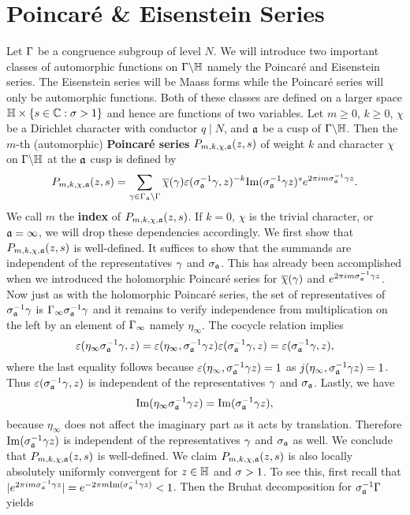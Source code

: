   \section{Poincar\'e \& Eisenstein Series}
    Let $\Gamma$ be a congruence subgroup of level $N$. We will introduce two important classes of automorphic functions on $\Gamma\backslash\mathbb{H}$ namely the Poincar\'e and Eisenstein series. The Eisenstein series will be Maass forms while the Poincar\'e series will only be automorphic functions. Both of these classes are defined on a larger space $\mathbb{H} \times \{s \in \mathbb{C}:\sigma > 1\}$ and hence are functions of two variables. Let $m \ge 0$, $k \ge 0$, $\chi$ be a Dirichlet character with conductor $q \mid N$, and $\mathfrak{a}$ be a cusp of $\Gamma\backslash\mathbb{H}$. Then the $m$-th (automorphic) \textbf{Poincar\'e series} $P_{m,k,\chi,\mathfrak{a}}(z,s)$ of weight $k$ and character $\chi$ on $\Gamma\backslash\mathbb{H}$ at the $\mathfrak{a}$ cusp is defined by
    \[
      P_{m,k,\chi,\mathfrak{a}}(z,s) = \sum_{\gamma \in \Gamma_{\mathfrak{a}}\backslash\Gamma}\overline{\chi}(\gamma)\varepsilon(\sigma_{\mathfrak{a}}^{-1}\gamma,z)^{-k}\mathrm{Im}(\sigma_{\mathfrak{a}}^{-1}\gamma z)^{s}e^{2\pi im\sigma_{\mathfrak{a}}^{-1}\gamma z}.
    \]
    We call $m$ the \textbf{index} of $P_{m,k,\chi,\mathfrak{a}}(z,s)$. If $k = 0$, $\chi$ is the trivial character, or $\mathfrak{a} = \infty$, we will drop these dependencies accordingly. We first show that $P_{m,k,\chi,\mathfrak{a}}(z,s)$ is well-defined. It suffices to show that the summands are independent of the representatives $\gamma$ and $\sigma_{\mathfrak{a}}$. This has already been accomplished when we introduced the holomorphic Poincar\'e series for $\overline{\chi}(\gamma)$ and $e^{2\pi im\sigma_{\mathfrak{a}}^{-1}\gamma z}$. Now just as with the holomorphic Poincar\'e series, the set of representatives of $\sigma_{\mathfrak{a}}^{-1}\gamma$ is $\Gamma_{\infty}\sigma_{\mathfrak{a}}^{-1}\gamma$ and it remains to verify independence from multiplication on the left by an element of $\Gamma_{\infty}$ namely $\eta_{\infty}$. The cocycle relation implies
    \[
      \varepsilon(\eta_{\infty}\sigma_{\mathfrak{a}}^{-1}\gamma,z) = \varepsilon(\eta_{\infty},\sigma_{\mathfrak{a}}^{-1}\gamma z)\varepsilon(\sigma_{\mathfrak{a}}^{-1}\gamma,z) = \varepsilon(\sigma_{\mathfrak{a}}^{-1}\gamma,z),
    \]
    where the last equality follows because $\varepsilon(\eta_{\infty},\sigma_{\mathfrak{a}}^{-1}\gamma z) = 1$ as $j(\eta_{\infty},\sigma_{\mathfrak{a}}^{-1}\gamma z) = 1$. Thus $\varepsilon(\sigma_{\mathfrak{a}}^{-1}\gamma,z)$ is independent of the representatives $\gamma$ and $\sigma_{\mathfrak{a}}$. Lastly, we have
    \[
      \mathrm{Im}(\eta_{\infty}\sigma_{\mathfrak{a}}^{-1}\gamma z) = \mathrm{Im}(\sigma_{\mathfrak{a}}^{-1}\gamma z),
    \]
    because $\eta_{\infty}$ does not affect the imaginary part as it acts by translation. Therefore $\mathrm{Im}(\sigma_{\mathfrak{a}}^{-1}\gamma z)$ is independent of the representatives $\gamma$ and $\sigma_{\mathfrak{a}}$ as well. We conclude that $P_{m,k,\chi,\mathfrak{a}}(z,s)$ is well-defined. We claim $P_{m,k,\chi,\mathfrak{a}}(z,s)$ is also locally absolutely uniformly convergent for $z \in \mathbb{H}$ and $\sigma > 1$. To see this, first recall that $|e^{2\pi im\sigma_{\mathfrak{a}}^{-1}\gamma z}| = e^{-2\pi m\mathrm{Im}(\sigma_{\mathfrak{a}}^{-1}\gamma z)} < 1$. Then the Bruhat decomposition for $\sigma_{\mathfrak{a}}^{-1}\Gamma$ yields
